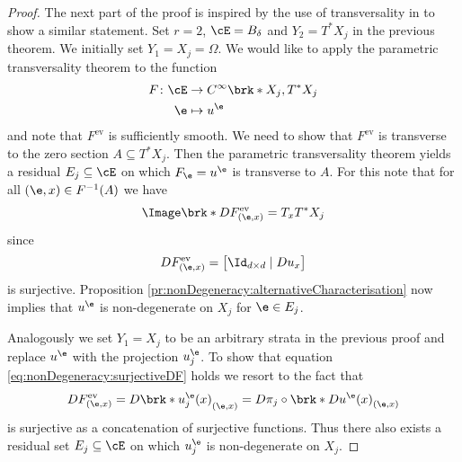 \begin{proof}
  The next part of the proof is inspired by the use of transversality in \cite[§6 Theorem 1.2]{Hirsch1994} to show a similar statement.
  Set $r=2$, $\cE=B_\delta$ and $Y_2=T^*X_j$ in the previous theorem.
  We initially set $Y_1=X_j=\Omega$.
  We would like to apply the parametric transversality theorem to the function
  \begin{align*}
    F\colon \cE&\to C^\infty\brk*{X_j,T^*X_j} \\
    \e&\mapsto u^\e
  \end{align*}
  and note that $F^\text{ev}$ is sufficiently smooth. 
  We need to show that $F^\text{ev}$ is transverse to the
  zero section $A\subseteq T^*X_j$. Then the parametric transversality theorem 
  yields a residual $E_j\subseteq \cE$ on which
  $F_\e=u^\e$ is transverse to $A$.
  For this note that for all $(\e,x)\in F^{-1}(A)$ we have
  \begin{align}
    \Image\brk*{DF^\text{ev}_{(\e,x)}}=T_xT^*X_j\label{eq:nonDegeneracy:surjectiveDF}
  \end{align}
  since
  \begin{align*}
    DF^\text{ev}_{(\e,x)}=\begin{bmatrix}
      \Id_{d\times d}\mid Du_x
    \end{bmatrix}
  \end{align*}
  is surjective. 
  Proposition \ref{pr:nonDegeneracy:alternativeCharacterisation}
  now implies that $u^\e$ is non-degenerate on $X_j$ for $\e\in E_j$.
  
  Analogously we set $Y_1=X_j$ to be an arbitrary strata in the previous proof and replace
  $u^\e$ with the projection $u_j^\e$. To show that
  equation \eqref{eq:nonDegeneracy:surjectiveDF} holds we resort to the fact that
  \begin{align*}
    DF^\text{ev}_{(\e,x)}
    =D\brk*{u_j^\e(x)}_{(\e,x)}
    =D\pi_j\circ \brk*{Du^\e(x)}_{(\e,x)}
  \end{align*}
  is surjective as a concatenation of surjective functions.
  Thus there also exists a residual set $E_j\subseteq\cE$ on which $u^\e_j$ is
  non-degenerate on $X_j$.


\end{proof}
